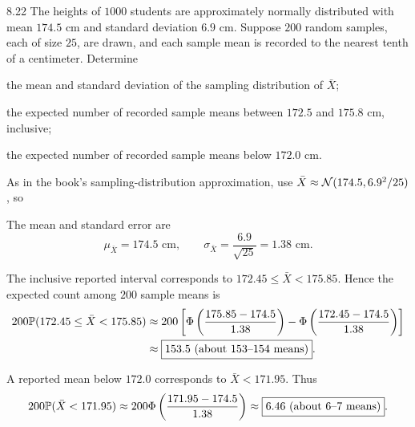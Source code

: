\documentclass[11pt,oneside]{article}
\begin{document}
\begin{exercise}{8.22}
The heights of $1000$ students are approximately normally distributed with mean $174.5$ cm and standard deviation $6.9$ cm. Suppose $200$ random samples, each of size $25$, are drawn, and each sample mean is recorded to the nearest tenth of a centimeter. Determine
\begin{exercisesubparts}
\item the mean and standard deviation of the sampling distribution of $\bar X$;
\item the expected number of recorded sample means between $172.5$ and $175.8$ cm, inclusive;
\item the expected number of recorded sample means below $172.0$ cm.
\end{exercisesubparts}
\end{exercise}
\begin{solution}
As in the book's sampling-distribution approximation, use $\bar X\approx\mathcal{N}(174.5, 6.9^2/25)$, so
\begin{exercisesubparts}
\item The mean and standard error are
\[
\boxed{\mu_{\bar X}=174.5\text{ cm}}, \qquad
\boxed{\sigma_{\bar X}=\frac{6.9}{\sqrt{25}}=1.38\text{ cm}}.
\]
\item The inclusive reported interval corresponds to $172.45\le\bar X<175.85$. Hence the expected count among $200$ sample means is
\[
\begin{aligned}
200\mathbb{P}(172.45\le\bar X<175.85)
&\approx200\left[\Phi\left(\frac{175.85-174.5}{1.38}\right)
-\Phi\left(\frac{172.45-174.5}{1.38}\right)\right]\\
&\approx\boxed{153.5\text{ (about }153\text{--}154\text{ means)}}.
\end{aligned}
\]
\item A reported mean below $172.0$ corresponds to $\bar X<171.95$. Thus
\[
200\mathbb{P}(\bar X<171.95)
\approx200\Phi\left(\frac{171.95-174.5}{1.38}\right)
\approx\boxed{6.46\text{ (about }6\text{--}7\text{ means)}}.
\]
\end{exercisesubparts}
\end{solution}
\end{document}

